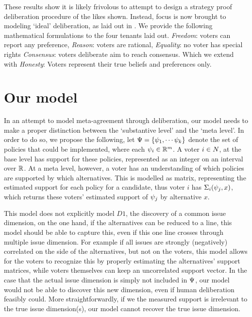 These results show it is likely frivolous to attempt to design a strategy proof
deliberation procedure of the likes shown. Instead, focus is now brought to
modeling `ideal' deliberation, as laid out in .
We provide the following mathematical formulations to the four tenants laid
out. \emph{Freedom}: voters can report any preference, \emph{Reason}: voters
are rational, \emph{Equality}: no voter has special rights \emph{Consensus}:
voters deliberate aim to reach consensus. Which we extend with \emph{Honesty}:
Voters represent their true beliefs and preferences only.


\section{Our model} \label{sec: main model}

In an attempt to model meta-agreement through deliberation, our model needs to
make a proper distinction between the `substantive level' and the `meta level'.
In order to do so, we propose the following, let \(\Psi = \{\psi_{1},
\cdots \psi_{k}\}\) denote the set of policies that could be implemented,
where each $\psi_i \in \mathbb{R}^{m}$. A voter $i \in N$, at the base
level has support for these policies, represented as an integer on an interval
over $\mathbb{R}$. At a meta level, however, a voter has an understanding of which
policies are supported by which alternatives. This is modelled as matrix,
representing the estimated support for each policy for a candidate, thus voter
$i$ has $\Sigma_i(\psi_j, x)$, which returns these voters' estimated
support of $\psi_j$ by alternative $x$.

This model does not explicitly model $D1$, the discovery of a common issue
dimension, on the one hand, if the alternatives can be reduced to a line, this
model should be able to capture this, even if this one line crosses through
multiple issue dimension. For example if all issues are strongly (negatively)
correlated on the side of the alternatives, but not on the voters, this model
allows for the voters to recognize this by properly estimating the
alternatives' support matrices, while voters themselves can keep an
uncorrelated support vector. In the case that the actual issue dimension is
simply not included in $\Psi$, our model would not be able to discover
this new dimension, even if human deliberation feasibly could. More
straightforwardly, if we the measured support is irrelevant to the true issue
dimension(s), our model cannot recover the true issue dimension.

